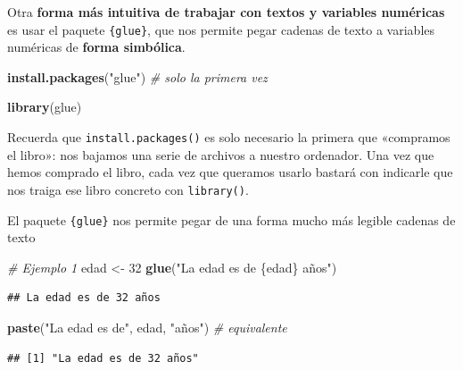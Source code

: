 \documentclass[11pt,]{book}
\newenvironment{Shaded}{\begin{snugshade}}{\end{snugshade}}
\newcommand{\CommentTok}[1]{\textcolor[rgb]{0.37,0.37,0.37}{\textit{#1}}}
\newcommand{\DecValTok}[1]{\textcolor[rgb]{0.06,0.06,0.06}{#1}}
\newcommand{\KeywordTok}[1]{\textcolor[rgb]{0.27,0.27,0.27}{\textbf{#1}}}
\newcommand{\NormalTok}[1]{#1}
\newcommand{\StringTok}[1]{\textcolor[rgb]{0.5,0.5,0.5}{#1}}
\begin{document}
Otra \textbf{forma más intuitiva de trabajar con textos y variables numéricas} es usar el paquete \texttt{\{glue\}}, que nos permite pegar cadenas de texto a variables numéricas de \textbf{forma simbólica}.

\begin{Shaded}
\begin{Highlighting}[]
\KeywordTok{install.packages}\NormalTok{(}\StringTok{"glue"}\NormalTok{) }\CommentTok{# solo la primera vez}
\end{Highlighting}
\end{Shaded}

\begin{Shaded}
\begin{Highlighting}[]
\KeywordTok{library}\NormalTok{(glue)}
\end{Highlighting}
\end{Shaded}

Recuerda que \texttt{install.packages()} es solo necesario la primera que «compramos el libro»: nos bajamos una serie de archivos a nuestro ordenador. Una vez que hemos comprado el libro, cada vez que queramos usarlo bastará con indicarle que nos traiga ese libro concreto con \texttt{library()}.

El paquete \texttt{\{glue\}} nos permite pegar de una forma mucho más legible cadenas de texto

\begin{Shaded}
\begin{Highlighting}[]
\CommentTok{# Ejemplo 1}
\NormalTok{edad <-}\StringTok{ }\DecValTok{32}
\KeywordTok{glue}\NormalTok{(}\StringTok{"La edad es de \{edad\} años"}\NormalTok{)}
\end{Highlighting}
\end{Shaded}

\begin{verbatim}
## La edad es de 32 años
\end{verbatim}

\begin{Shaded}
\begin{Highlighting}[]
\KeywordTok{paste}\NormalTok{(}\StringTok{"La edad es de"}\NormalTok{, edad, }\StringTok{"años"}\NormalTok{) }\CommentTok{# equivalente}
\end{Highlighting}
\end{Shaded}

\begin{verbatim}
## [1] "La edad es de 32 años"
\end{verbatim}
\end{document}
